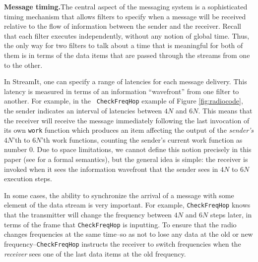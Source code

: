 {\bf Message timing.}The central aspect of the messaging system is a
sophisticated timing mechanism that allows filters to specify when a
message will be received relative to the flow of information between
the sender and the receiver.  Recall that each filter executes
independently, without any notion of global time.  Thus, the only way
for two filters to talk about a time that is meaningful for both of
them is in terms of the data items that are passed through the streams
from one to the other.

In StreamIt, one can specify a range of latencies for each message
delivery.  This latency is measured in terms of an information
``wavefront'' from one filter to another.  For example, in the {\tt
CheckFreqHop} example of Figure \ref{fig:radiocode}, the sender
indicates an interval of latencies between $4N$ and $6N$.  This means
that the receiver will receive the message immediately following the
last invocation of its own {\tt work} function which produces an item
affecting the output of the {\it sender's} $4N$'th to $6N$'th work
functions, counting the sender's current work function as number 0.  Due
to space limitations, we cannot define this notion precisely in this
paper (see \cite{streamittech620,streamittech622} for a formal
semantics), but the general idea is simple: the receiver is invoked when
it sees the information wavefront that the sender sees in $4N$ to $6N$
execution steps.

In some cases, the ability to synchronize the arrival of a message
with some element of the data stream is very important.  For example,
{\tt CheckFreqHop} knows that the transmitter will change the
frequency between $4N$ and $6N$ steps later, in terms of the frame
that {\tt CheckFreqHop} is inputting.  To ensure that the radio
changes frequencies at the same time--so as not to lose any data at
the old or new frequency--{\tt CheckFreqHop} instructs the receiver to
switch frequencies when the {\it receiver} sees one of the last data
items at the old frequency.

